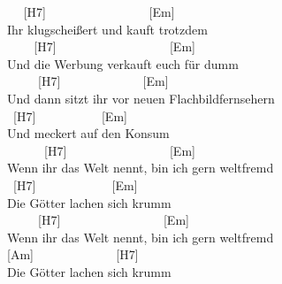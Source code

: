 \documentclass[
  letterpaper,
]{scrbook}
\begin{document}
~ ~{[}H7{]} ~ ~ ~ ~ ~ ~ ~ ~ ~ ~{[}Em{]}\\
Ihr klugscheißert und kauft trotzdem\\
\hspace*{0.333em} ~ ~ ~{[}H7{]} ~ ~ ~ ~ ~ ~ ~ ~ ~ ~ ~{[}Em{]}\\
Und die Werbung verkauft euch für dumm\\
\hspace*{0.333em} ~ ~ ~ {[}H7{]} ~ ~ ~ ~ ~ ~ ~ ~{[}Em{]}\\
Und dann sitzt ihr vor neuen Flachbildfernsehern\\
\hspace*{0.333em} ~{[}H7{]} ~ ~ ~ ~ ~ ~ {[}Em{]}\\
Und meckert auf den Konsum\\
\hspace*{0.333em} ~ ~ ~ ~{[}H7{]} ~ ~ ~ ~ ~ ~ ~ ~ ~ ~{[}Em{]} ~\\
Wenn ihr das Welt nennt, bin ich gern weltfremd\\
\hspace*{0.333em} ~{[}H7{]} ~ ~ ~ ~ ~ ~ ~ {[}Em{]}\\
Die Götter lachen sich krumm\\
\hspace*{0.333em} ~ ~ ~ {[}H7{]} ~ ~ ~ ~ ~ ~ ~ ~ ~ ~{[}Em{]}\\
Wenn ihr das Welt nennt, bin ich gern weltfremd\\
\hspace*{0.333em} {[}Am{]} ~ ~ ~ ~ ~ ~ ~ ~{[}H7{]}\\
Die Götter lachen sich krumm
\end{document}
